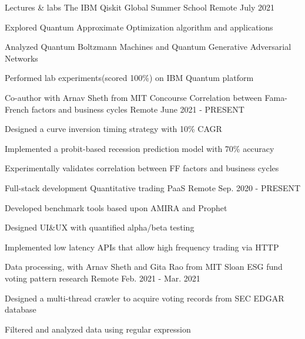 \begin{cventries}
  \cventry
    {Lectures \& labs}
    {The IBM Qiskit Global Summer School}
    {Remote}
    {July 2021}
    {
      \begin{cvitems}
        \item {Explored Quantum Approximate Optimization algorithm and applications}
        \item {Analyzed Quantum Boltzmann Machines and Quantum Generative Adversarial Networks}
        \item {Performed lab experiments(scored 100\%) on IBM Quantum platform}
      \end{cvitems}
    }

  \cventry
    {Co-author with Arnav Sheth from MIT Concourse}
    {Correlation between Fama-French factors and business cycles}
    {Remote}
    {June 2021 - PRESENT}
    {
      \begin{cvitems}
        \item {Designed a curve inversion timing strategy with 10\% CAGR}
        \item {Implemented a probit-based recession prediction model with 70\% accuracy}
        \item {Experimentally validates correlation between FF factors and business cycles}
      \end{cvitems}
    }

  \cventry
    {Full-stack development}
    {Quantitative trading PaaS}
    {Remote}
    {Sep. 2020 - PRESENT}
    {
      \begin{cvitems}
        \item {Developed benchmark tools based upon AMIRA and Prophet}
        \item {Designed UI\&UX with quantified alpha/beta testing}
        \item {Implemented low latency APIs that allow high frequency trading via HTTP}
      \end{cvitems}
    }

  \cventry
    {Data processing, with Arnav Sheth and Gita Rao from MIT Sloan}
    {ESG fund voting pattern research}
    {Remote}
    {Feb. 2021 - Mar. 2021}
    {
      \begin{cvitems}
        \item {Designed a multi-thread crawler to acquire voting records from SEC EDGAR database}
        \item {Filtered and analyzed data using regular expression}
      \end{cvitems}
    }


\end{cventries}
